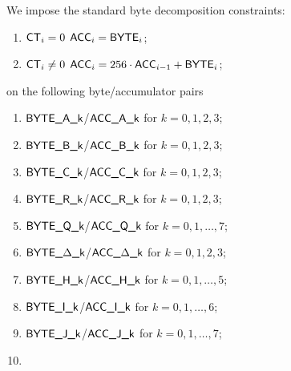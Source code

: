 We impose the standard byte decomposition constraints:
\begin{enumerate}
	\item \If $\textsf{CT}_{i} = 0$ \Then $\textsf{ACC}_{i} = \textsf{BYTE}_{i}$;
	\item \If $\textsf{CT}_{i} \neq 0$ \Then $\textsf{ACC}_{i} = 256 \cdot \textsf{ACC}_{i - 1} + \textsf{BYTE}_{i}$;
\end{enumerate}
on the following byte/accumulator pairs
\begin{multicols}{2}
\begin{enumerate}
	\item $\textsf{BYTE}\textsf{\_A\_k}$/$\textsf{ACC}\textsf{\_A\_k}$ for $k=0,1,2,3$;
	\item $\textsf{BYTE}\textsf{\_B\_k}$/$\textsf{ACC}\textsf{\_B\_k}$ for $k=0,1,2,3$;
	\item $\textsf{BYTE}\textsf{\_C\_k}$/$\textsf{ACC}\textsf{\_C\_k}$ for $k=0,1,2,3$;
	\item $\textsf{BYTE}\textsf{\_R\_k}$/$\textsf{ACC}\textsf{\_R\_k}$ for $k=0,1,2,3$;
	\item $\textsf{BYTE}\textsf{\_Q\_k}$/$\textsf{ACC}\textsf{\_Q\_k}$ for $k=0,1,\dots, 7$;
	\item $\textsf{BYTE}\textsf{\_$\Delta$\_k}$/$\textsf{ACC}\textsf{\_$\Delta$\_k}$ for $k=0,1,2,3$;
	\item $\textsf{BYTE}\textsf{\_H\_k}$/$\textsf{ACC}\textsf{\_H\_k}$ for $k=0,1,\dots, 5$;
	\item $\textsf{BYTE}\textsf{\_I\_k}$/$\textsf{ACC}\textsf{\_I\_k}$ for $k=0,1,\dots, 6$;
	\item $\textsf{BYTE}\textsf{\_J\_k}$/$\textsf{ACC}\textsf{\_J\_k}$ for $k=0,1,\dots, 7$;
	\item[\vspace{\fill}]
\end{enumerate}
\end{multicols}
